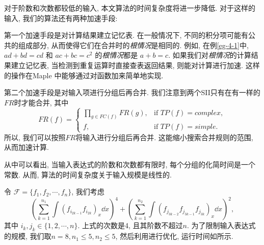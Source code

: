 对于阶数和次数都较低的输入, 本文算法的时间复杂度将进一步降低. 对于这样的输入, 我们的算法还有两种加速手段: 
\begin{asparaenum}[(I)]
\item 第一个加速手段是对计算结果建立记忆表. 在一般情况下, 不同的积分项可能有公共的组成部分, 从而使得它们在合并时的\emph{根情况}是相同的. 例如, 在例\ref{eg-4-1}中, $ad+bd=cd$ 和 $ac+bc=c^2$ 的\emph{根情况}都是 $a+b=c$. 如果我们对\emph{根情况}的计算结果建立记忆表, 当检测到重复运算时直接查表返回结果, 则能对计算进行加速. 这样的操作在Maple 中能够通过对函数加来简单地实现\citep{maple_programming}.
\item 第二个加速手段是对输入项进行分组后再合并. 我们注意到两个SII只有在有一样的$FR$时才能合并, 其中\begin{equation}    
FR(f)=\left\{
\begin{array}{cl}
\prod\limits_{g\in FC(f)}{FR(g)}, &\text{if }TP(f)=complex,\\ 
f,           &\text{if }TP(f)=simple.
\end{array}
\right.
\end{equation} 
所以, 我们可以按照$FR$将输入进行分组后再合并. 这能缩小搜索合并规则的范围, 从而加速计算. 
\end{asparaenum}

从中可以看出, 当输入表达式的阶数和次数都有限时, 每个分组的化简时间是一个常数. 从而, 算法的时间复杂度关于输入规模是线性的. 

令 $\mathcal F=\{f_1,f_2,\cdots,f_n\}$, 我们考虑
\begin{equation}
\left(\sum\limits_{k=1}^{n_1}{\int\!{(f_{i_{2k-1}}f_{i_{2k}})_x\dd x}}\right)^4+\left(\sum\limits_{k=1}^{n_2}{\int\!{(f_{j_{3k-2}}f_{j_{3k-1}}f_{j_{3k}})_x\dd x}}\right)^2,
\label{construct}
\end{equation}
其中 $i_k,j_k \in \{1,2,\cdots,n\}$. 上式的次数是4, 且其阶数不超过$n$. 为了限制输入表达式的规模, 我们取$n=8,n_1\le 5,n_2\le 5$, 然后利用进行优化, 运行时间如所示.  

